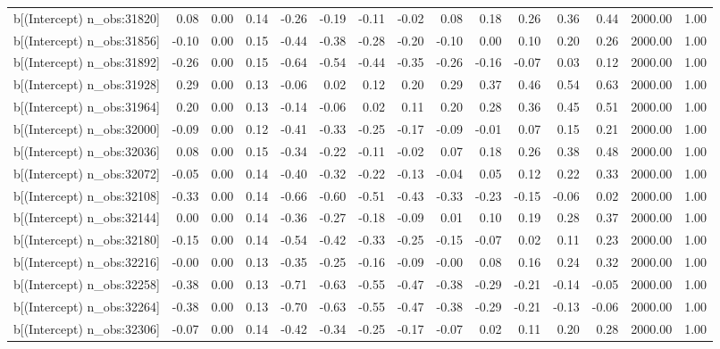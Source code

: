 \begin{table}[ht]
\begin{tabular}{rrrrrrrrrrrrrrr}
  b[(Intercept) n\_obs:31820] & 0.08 & 0.00 & 0.14 & -0.26 & -0.19 & -0.11 & -0.02 & 0.08 & 0.18 & 0.26 & 0.36 & 0.44 & 2000.00 & 1.00 \\ 
  b[(Intercept) n\_obs:31856] & -0.10 & 0.00 & 0.15 & -0.44 & -0.38 & -0.28 & -0.20 & -0.10 & 0.00 & 0.10 & 0.20 & 0.26 & 2000.00 & 1.00 \\ 
  b[(Intercept) n\_obs:31892] & -0.26 & 0.00 & 0.15 & -0.64 & -0.54 & -0.44 & -0.35 & -0.26 & -0.16 & -0.07 & 0.03 & 0.12 & 2000.00 & 1.00 \\ 
  b[(Intercept) n\_obs:31928] & 0.29 & 0.00 & 0.13 & -0.06 & 0.02 & 0.12 & 0.20 & 0.29 & 0.37 & 0.46 & 0.54 & 0.63 & 2000.00 & 1.00 \\ 
  b[(Intercept) n\_obs:31964] & 0.20 & 0.00 & 0.13 & -0.14 & -0.06 & 0.02 & 0.11 & 0.20 & 0.28 & 0.36 & 0.45 & 0.51 & 2000.00 & 1.00 \\ 
  b[(Intercept) n\_obs:32000] & -0.09 & 0.00 & 0.12 & -0.41 & -0.33 & -0.25 & -0.17 & -0.09 & -0.01 & 0.07 & 0.15 & 0.21 & 2000.00 & 1.00 \\ 
  b[(Intercept) n\_obs:32036] & 0.08 & 0.00 & 0.15 & -0.34 & -0.22 & -0.11 & -0.02 & 0.07 & 0.18 & 0.26 & 0.38 & 0.48 & 2000.00 & 1.00 \\ 
  b[(Intercept) n\_obs:32072] & -0.05 & 0.00 & 0.14 & -0.40 & -0.32 & -0.22 & -0.13 & -0.04 & 0.05 & 0.12 & 0.22 & 0.33 & 2000.00 & 1.00 \\ 
  b[(Intercept) n\_obs:32108] & -0.33 & 0.00 & 0.14 & -0.66 & -0.60 & -0.51 & -0.43 & -0.33 & -0.23 & -0.15 & -0.06 & 0.02 & 2000.00 & 1.00 \\ 
  b[(Intercept) n\_obs:32144] & 0.00 & 0.00 & 0.14 & -0.36 & -0.27 & -0.18 & -0.09 & 0.01 & 0.10 & 0.19 & 0.28 & 0.37 & 2000.00 & 1.00 \\ 
  b[(Intercept) n\_obs:32180] & -0.15 & 0.00 & 0.14 & -0.54 & -0.42 & -0.33 & -0.25 & -0.15 & -0.07 & 0.02 & 0.11 & 0.23 & 2000.00 & 1.00 \\ 
  b[(Intercept) n\_obs:32216] & -0.00 & 0.00 & 0.13 & -0.35 & -0.25 & -0.16 & -0.09 & -0.00 & 0.08 & 0.16 & 0.24 & 0.32 & 2000.00 & 1.00 \\ 
  b[(Intercept) n\_obs:32258] & -0.38 & 0.00 & 0.13 & -0.71 & -0.63 & -0.55 & -0.47 & -0.38 & -0.29 & -0.21 & -0.14 & -0.05 & 2000.00 & 1.00 \\ 
  b[(Intercept) n\_obs:32264] & -0.38 & 0.00 & 0.13 & -0.70 & -0.63 & -0.55 & -0.47 & -0.38 & -0.29 & -0.21 & -0.13 & -0.06 & 2000.00 & 1.00 \\ 
  b[(Intercept) n\_obs:32306] & -0.07 & 0.00 & 0.14 & -0.42 & -0.34 & -0.25 & -0.17 & -0.07 & 0.02 & 0.11 & 0.20 & 0.28 & 2000.00 & 1.00 \\ 

\end{tabular}
\end{table}
